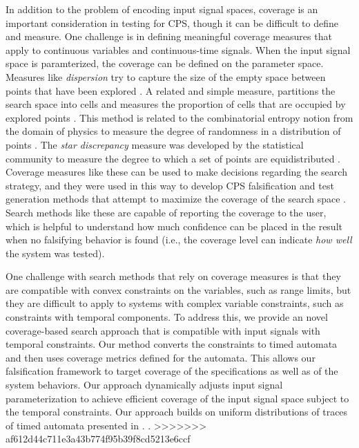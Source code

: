In addition to the problem of encoding input signal spaces, coverage is an important consideration in testing for CPS, though it can be 
difficult to define and measure.
One challenge is in defining meaningful coverage measures that apply to continuous
variables and continuous-time signals. When the input signal space is paramterized, the coverage can be defined on the parameter space. 
Measures like \emph{dispersion} try to capture the size of the empty space between points that have been explored \cite{Esposito04}.
A related and simple measure, partitions the search space into cells and measures the proportion of cells that are occupied by explored points \cite{Skruch2011}.
This method is related to the combinatorial entropy notion from the domain of physics to measure the degree of randomness in a distribution of points \cite{Gabbay06}.
The \emph{star discrepancy} measure was developed by the statistical community 
to measure the degree to which a set of points are equidistributed
\cite{Heinrich03}. 
Coverage measures like these can be used to make decisions regarding the search strategy, and they were used in this way to develop CPS falsification and test generation methods that attempt to maximize the coverage of the search space \cite{DangN09,Dreossi2015,CAV2017}. Search methods like these are capable of reporting the coverage to the user, which is helpful to understand how much confidence 
can be placed in the result when no falsifying behavior is found (i.e., the coverage level can indicate \emph{how well} the system was tested). 

One challenge with search methods that rely on coverage measures  is that they are compatible with convex constraints on the variables, such as range limits, 
but they are difficult to apply to systems with complex variable constraints, such as constraints with temporal components.
To address this, we provide an novel coverage-based search approach that is compatible with input signals with temporal constraints. Our method converts the constraints to 
timed automata and then uses coverage metrics defined for the automata.
This allows our falsification framework to target coverage of the specifications as well as of the system behaviors.
Our approach dynamically adjusts input signal parameterization to achieve
efficient coverage of the input signal space subject to
the temporal constraints. Our approach builds on uniform
distributions of traces of timed automata presented in \cite{}.
.
>>>>>>> af612d44c711e3a43b774f95b39f8cd5213e6ccf


